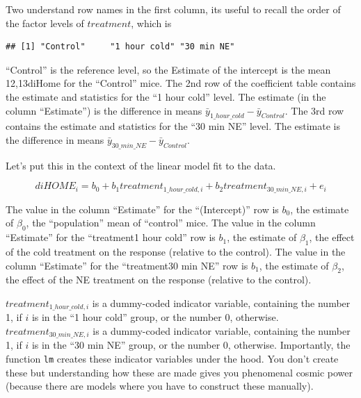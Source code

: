 \documentclass[]{book}
\newenvironment{Shaded}{\begin{snugshade}}{\end{snugshade}}
\newcommand{\KeywordTok}[1]{\textcolor[rgb]{0.13,0.29,0.53}{\textbf{#1}}}
\newcommand{\NormalTok}[1]{#1}
\newcommand{\OperatorTok}[1]{\textcolor[rgb]{0.81,0.36,0.00}{\textbf{#1}}}
\begin{document}
Two understand row names in the first column, its useful to recall the order of the factor levels of \(treatment\), which is

\begin{Shaded}
\end{Shaded}

\begin{verbatim}
## [1] "Control"     "1 hour cold" "30 min NE"
\end{verbatim}

``Control'' is the reference level, so the Estimate of the intercept is the mean 12,13diHome for the ``Control'' mice. The 2nd row of the coefficient table contains the estimate and statistics for the ``1 hour cold'' level. The estimate (in the column ``Estimate'') is the difference in means \(\bar{y}_{1\_hour\_cold} - \bar{y}_{Control}\). The 3rd row contains the estimate and statistics for the ``30 min NE'' level. The estimate is the difference in means \(\bar{y}_{30\_min\_NE} - \bar{y}_{Control}\).

Let's put this in the context of the linear model fit to the data.

\begin{equation}
diHOME_i = b_0 + b_1 treatment_{1\_hour\_cold,i} + b_2 treatment_{30\_min\_NE,i} + e_i
\label{eq:fit-dihome}
\end{equation}

The value in the column ``Estimate'' for the ``(Intercept)'' row is \(b_0\), the estimate of \(\beta_0\), the ``population'' mean of ``control'' mice. The value in the column ``Estimate'' for the ``treatment1 hour cold'' row is \(b_1\), the estimate of \(\beta_1\), the effect of the cold treatment on the response (relative to the control). The value in the column ``Estimate'' for the ``treatment30 min NE'' row is \(b_1\), the estimate of \(\beta_2\), the effect of the NE treatment on the response (relative to the control).

\(treatment_{1\_hour\_cold, i}\) is a dummy-coded indicator variable, containing the number 1, if \(i\) is in the ``1 hour cold'' group, or the number 0, otherwise. \(treatment_{30\_min\_NE, i}\) is a dummy-coded indicator variable, containing the number 1, if \(i\) is in the ``30 min NE'' group, or the number 0, otherwise. Importantly, the function \texttt{lm} creates these indicator variables under the hood. You don't create these but understanding how these are made gives you phenomenal cosmic power (because there are models where you have to construct these manually).
\end{document}
